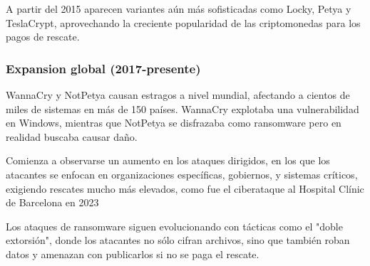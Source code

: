 A partir del 2015 aparecen variantes aún más sofisticadas como Locky, Petya y TeslaCrypt, aprovechando la creciente popularidad de las criptomonedas para los pagos de rescate.

\subsubsection{Expansion global (2017-presente)}
WannaCry y NotPetya causan estragos a nivel mundial, afectando a cientos de miles de sistemas en más de 150 países. WannaCry explotaba una vulnerabilidad en Windows, mientras que NotPetya se disfrazaba como ransomware pero en realidad buscaba causar daño.

Comienza a observarse un aumento en los ataques dirigidos, en los que los atacantes se enfocan en organizaciones específicas, gobiernos, y sistemas críticos, exigiendo rescates mucho más elevados, como fue el ciberataque al Hospital Clínic de
Barcelona en 2023\autocite{blanchar2023ciberataque}

Los ataques de ransomware siguen evolucionando con tácticas como el "doble extorsión", donde los atacantes no sólo cifran archivos, sino que también roban datos y amenazan con publicarlos si no se paga el rescate.

